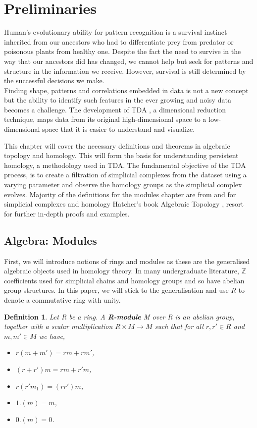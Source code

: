 \documentclass{article}
\newtheorem{definition}[theorem]{Definition}
\begin{document}
\section{Preliminaries}
Human's evolutionary ability for pattern recognition is a survival instinct inherited from our ancestors who had to differentiate prey from predator or poisonous plants from healthy one. Despite the fact the need to survive in the way that our ancestors did has changed, we cannot help but seek for patterns and structure in the information we receive. However, survival is still determined by the successful decisions we make. \\

Finding shape, patterns and correlations embedded in data is not a new concept but the ability to identify such features in the ever growing and noisy data becomes a challenge. The development of TDA , a dimensional reduction technique, maps data from its original high-dimensional space to a low-dimensional space that it is easier to understand and visualize.

This chapter will cover the necessary definitions and theorems in algebraic topology and homology. This will form the basis for understanding persistent homology, a methodology used in TDA. The fundamental objective of the TDA process, is to create a filtration of simplicial complexes from the dataset using a varying parameter and observe the homology groups as the simplicial complex evolves. Majority of the definitions for the modules chapter are from \cite{HSchenckAlgebraicFound} and for simplicial complexes and homology Hatcher's book Algebraic Topology \cite{Hatcher}, resort for further in-depth proofs and examples.
\subsection{Algebra: Modules}
First, we will introduce notions of rings and modules as these are the generalised algebraic objects used in homology theory. In many undergraduate literature, $\mathbb{Z}$ coefficients used for simplicial chains and homology groups and so have abelian group structures. In this paper, we will stick to the generalisation and use $R$ to denote a commutative ring with unity.
\begin{definition}
Let R be a ring. A \textbf{R-module} M over  R is an abelian group, together with a scalar multiplication $R \times M \to M$ such that for all $r, r' \in R$ and $m, m' \in M$ we have,
\begin{itemize}
    \item $r(m + m') = rm + rm'$,
    \item $(r + r')m = rm + r'm$,
    \item $r(r'm_1) = (rr')m$,
    \item $1.(m) = m$,
    \item $0.(m) = 0$.
\end{itemize}
\end{definition}
\end{document}
